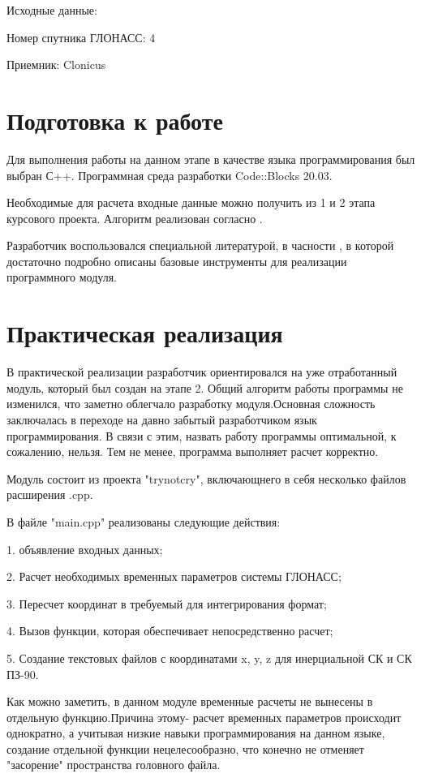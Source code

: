 \documentclass[]{article}
\begin{document}
Исходные данные: 

Номер спутника ГЛОНАСС: 4

Приемник: Clonicus

\section{Подготовка к работе}
Для выполнения работы на данном этапе в качестве языка программирования был выбран С++. Программная среда разработки Code::Blocks 20.03. 

Необходимые для расчета входные данные можно получить из 1 и 2 этапа курсового проекта. Алгоритм реализован согласно \cite{ICD}. 

Разработчик воспользовался специальной литературой, в часности \cite{alex}, в которой достаточно подробно описаны базовые инструменты для реализации программного модуля. 
\section{Практическая реализация}

В практической реализации разработчик ориентировался на уже отработанный модуль, который был создан на этапе 2. Общий алгоритм работы программы не изменился, что заметно облегчало разработку модуля.Основная сложность заключалась в переходе на давно забытый разработчиком язык программирования. В связи с этим, назвать работу программы оптимальной, к сожалению, нельзя. Тем не менее, программа выполняет расчет корректно.

Модуль состоит из проекта "trynotcry", включающнего в себя несколько файлов расширения .cpp.

В файле "main.cpp" реализованы следующие действия:

1. объявление входных данных;

2. Расчет необходимых временных параметров системы ГЛОНАСС;

3. Пересчет координат в требуемый для интегрирования формат;

4. Вызов функции, которая обеспечивает непосредственно  расчет;

5. Создание текстовых файлов с координатами x, y, z для инерциальной СК и СК ПЗ-90.
 
Как  можно заметить, в данном модуле временные расчеты не вынесены в отдельную функцию.Причина этому- расчет временных параметров происходит однократно, а учитывая низкие навыки программирования на данном языке, создание отдельной функции нецелесообразно, что конечно не отменяет "засорение" пространства головного файла.
\end{document}
